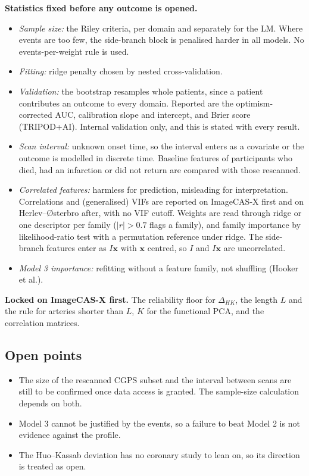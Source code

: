 \documentclass[11pt,a4paper]{article}
\begin{document}
\textbf{Statistics fixed before any outcome is opened.}
\begin{itemize}
  \item \emph{Sample size:} the Riley criteria, per domain and separately for the LM. Where events are
    too few, the side-branch block is penalised harder in all models. No events-per-weight rule is used.
  \item \emph{Fitting:} ridge penalty chosen by nested cross-validation.
  \item \emph{Validation:} the bootstrap resamples whole patients, since a patient contributes an outcome
    to every domain. Reported are the optimism-corrected AUC, calibration slope and intercept, and Brier
    score (TRIPOD+AI). Internal validation only, and this is stated with every result.
  \item \emph{Scan interval:} unknown onset time, so the interval enters as a covariate or the outcome is
    modelled in discrete time. Baseline features of participants who died, had an infarction or did not
    return are compared with those rescanned.
  \item \emph{Correlated features:} harmless for prediction, misleading for interpretation. Correlations
    and (generalised) VIFs are reported on ImageCAS-X first and on Herlev--{\O}sterbro after, with no VIF
    cutoff. Weights are read through ridge or one descriptor per family ($|r|>0.7$ flags a family), and
    family importance by likelihood-ratio test with a permutation reference under ridge. The side-branch
    features enter as $I\mathbf{x}$ with $\mathbf{x}$ centred, so $I$ and $I\mathbf{x}$ are uncorrelated.
  \item \emph{Model 3 importance:} refitting without a feature family, not shuffling (Hooker et al.).
\end{itemize}

\textbf{Locked on ImageCAS-X first.} The reliability floor for $\Delta_{HK}$, the length $L$ and the rule
for arteries shorter than $L$, $K$ for the functional PCA, and the correlation matrices.

\subsection*{Open points}

\begin{itemize}
  \item The size of the rescanned CGPS subset and the interval between scans are still to be
    confirmed once data access is granted. The sample-size calculation depends on both.
  \item Model 3 cannot be justified by the events, so a failure to beat Model 2 is not evidence against
    the profile.
  \item The Huo--Kassab deviation has no coronary study to lean on, so its direction is treated as open.
\end{itemize}
\end{document}
